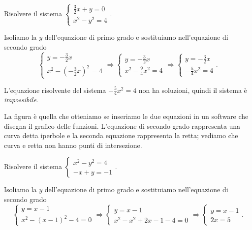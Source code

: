 \begin{exrig}
\begin{esempio}
Risolvere il sistema $\left\{\begin{array}{l}\frac 3 
2x+y=0\\x^2-y^2=4\end{array}\right..$

Isoliamo la $y$ dell'equazione di primo grado e sostituiamo nell'equazione di 
secondo grado 
\[\left\{\begin{array}{l}y=-\frac 3 2x \\
x^2-\left(-\frac 3 2x\right)^2=4\end{array}\right.
\Rightarrow \left\{\begin{array}{l}y=-\frac 3 2x \\
x^2-\frac 9 4x^2=4\end{array}\right.
\Rightarrow \left\{\begin{array}{l}y=-\frac 3 2x\\
-\frac 5 4x^2=4\end{array}\right..\]

L'equazione risolvente del sistema $-\frac 5 4x^2=4$ non ha soluzioni, quindi il 
sistema è \emph{impossibile}.
\begin{multicols}{2}
La figura è quella che otteniamo se inseriamo le due equazioni in un software 
che disegna il grafico delle funzioni. 
L'equazione di secondo grado rappresenta una curva detta iperbole e la seconda 
equazione rappresenta la retta; vediamo che curva e retta non hanno punti di 
intersezione.
\begin{center}

\end{center}
\end{multicols}
\end{esempio}

\begin{esempio}
Risolvere il sistema 
$\left\{\begin{array}{l}x^2-y^2=4\\-x+y=-1\end{array}\right.$.

Isoliamo la $y$ dell'equazione di primo grado e sostituiamo nell'equazione di 
secondo grado 
\[\left\{\begin{array}{l}y=x-1 \\
x^2-(x-1)^2-4=0\end{array}\right.
\Rightarrow \left\{\begin{array}{l}y=x-1 \\
x^2-x^2+2x-1-4=0\end{array}\right.
\Rightarrow \left\{\begin{array}{l}y=x-1\\2x=5\end{array}\right..\]


\end{esempio}
\end{exrig}
